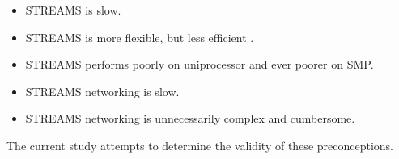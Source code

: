 \documentclass[letterpaper,final,notitlepage,twocolumn,10pt,twoside]{article}
\begin{document}
\begin{itemize}

\item STREAMS is slow.

\item STREAMS is more flexible, but less efficient \cite{lkmlfaq}.

\item STREAMS performs poorly on uniprocessor and ever poorer on SMP.

\item STREAMS networking is slow.

\item STREAMS networking is unnecessarily complex and cumbersome.

\end{itemize}

The current study attempts to determine the validity of these preconceptions.
\end{document}
